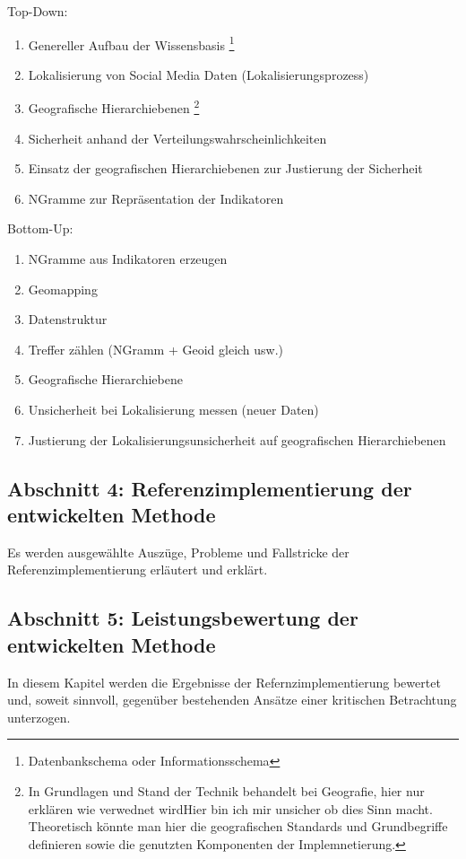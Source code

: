 			Top-Down:
			\begin{enumerate}
				\item Genereller Aufbau der Wissensbasis \footnote{Datenbankschema oder Informationsschema} 
				\item Lokalisierung von Social Media Daten (Lokalisierungsprozess) 
				\item Geografische Hierarchiebenen \footnote{In Grundlagen und Stand der Technik behandelt bei Geografie, hier nur erklären wie verwednet wirdHier bin ich mir unsicher ob dies Sinn macht. 
			Theoretisch könnte man hier die geografischen Standards und Grundbegriffe definieren sowie die genutzten Komponenten der Implemnetierung.}
				\item Sicherheit anhand der Verteilungswahrscheinlichkeiten
				\item Einsatz der geografischen Hierarchiebenen zur Justierung der Sicherheit    
				\item NGramme zur Repräsentation der Indikatoren
			\end{enumerate}

			Bottom-Up:

			\begin{enumerate}
				\item NGramme aus Indikatoren erzeugen
				\item Geomapping
				\item Datenstruktur
				\item Treffer zählen (NGramm + Geoid gleich usw.)
				\item Geografische Hierarchiebene
				\item Unsicherheit bei Lokalisierung messen (neuer Daten) 
				\item Justierung der Lokalisierungsunsicherheit auf geografischen Hierarchiebenen
			\end{enumerate}

		\subsection*{Abschnitt 4: Referenzimplementierung der entwickelten Methode}
			Es werden ausgewählte Auszüge, Probleme und Fallstricke der Referenzimplementierung erläutert und erklärt. 


		\subsection*{Abschnitt 5: Leistungsbewertung der entwickelten Methode}
			In diesem Kapitel werden die Ergebnisse der Refernzimplementierung bewertet und, soweit sinnvoll, gegenüber bestehenden Ansätze einer kritischen Betrachtung unterzogen. 


